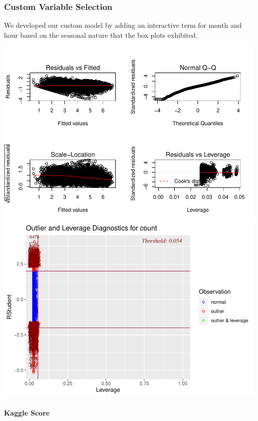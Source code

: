 \documentclass[american,]{article}
\let\oldparagraph\paragraph
\renewcommand{\paragraph}[1]{\oldparagraph{#1}\mbox{}}
\begin{document}
\newpage

\hypertarget{custom-variable-selection}{%
\subsubsection{Custom Variable Selection}\label{custom-variable-selection}}

We developed our custom model by adding an interactive term for month and hour based on the seasonal nature that the box plots exhibited.

\includegraphics{BikeSharingDemand_files/figure-latex/custom-model-1.pdf} \includegraphics{BikeSharingDemand_files/figure-latex/custom-model-2.pdf}

\newpage

\hypertarget{kaggle-score}{%
\paragraph{Kaggle Score}\label{kaggle-score}}
\end{document}
